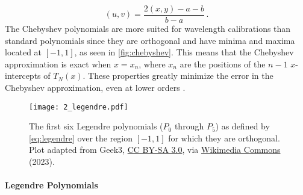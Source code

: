 \begin{equation} \label{eq:XtoUV}
    (u, v) = \frac{2 (x, y) - a - b}{b - a}\,.
\end{equation}
The Chebyshev polynomials are more suited for wavelength calibrations than standard polynomials since they are orthogonal and have minima and maxima located at $[-1, 1]$, as seen in \autoref{fig:chebyshev}. This means that the Chebyshev approximation is exact when $x = x_{n}$, where $x_{n}$ are the positions of the $n - 1$ $x$-intercepts of $T_{N}(x)$. These properties greatly minimize the error in the Chebyshev approximation, even at lower orders \citep{cheby}.



\begin{figure}[t]
    \centering
    \texttt{[image: 2\_legendre.pdf]}
    \caption{The first six Legendre polynomials ($P_0$ through $P_{5}$) as defined by \autoref{eq:legendre} over the region $[-1, 1]$ for which they are orthogonal. Plot adapted from Geek3, \protect\href{https://creativecommons.org/licenses/by-sa/3.0}{CC BY-SA 3.0}, via \protect\href{https://commons.wikimedia.org/wiki/File:Legendrepolynomials6.svg}{Wikimedia Commons} (2023).}
    \label{fig:legendre}
\end{figure}

\paragraph{Legendre Polynomials}


